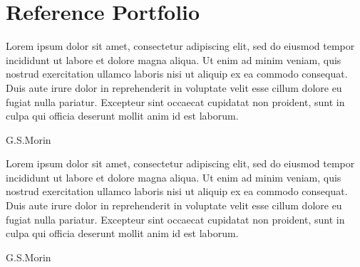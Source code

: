 \documentclass[12pt,letterpaper,sans]{moderncv} %
\begin{document}


\newpage


\section{Reference Portfolio}
\renewcommand{\epigraphsize}{\large}
\setlength{\epigraphwidth}{0.7\textwidth}
\renewcommand{\epigraphflush}{center}

\epigraph{Lorem ipsum dolor sit amet, consectetur adipiscing elit, sed do eiusmod tempor incididunt ut labore et dolore magna aliqua. Ut enim ad minim veniam, quis nostrud exercitation ullamco laboris nisi ut aliquip ex ea commodo consequat. Duis aute irure dolor in reprehenderit in voluptate velit esse cillum dolore eu fugiat nulla pariatur. Excepteur sint occaecat cupidatat non proident, sunt in culpa qui officia deserunt mollit anim id est laborum.}{G.S.Morin}

\epigraph{Lorem ipsum dolor sit amet, consectetur adipiscing elit, sed do eiusmod tempor incididunt ut labore et dolore magna aliqua. Ut enim ad minim veniam, quis nostrud exercitation ullamco laboris nisi ut aliquip ex ea commodo consequat. Duis aute irure dolor in reprehenderit in voluptate velit esse cillum dolore eu fugiat nulla pariatur. Excepteur sint occaecat cupidatat non proident, sunt in culpa qui officia deserunt mollit anim id est laborum.}{G.S.Morin}

\end{document}
